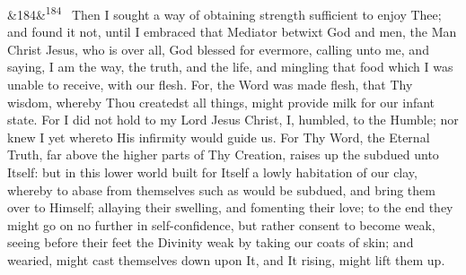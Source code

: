 \documentclass[12pt]{article}
\newcommand{\para}[1][]{\par\noindent\ifx&#1&\else\textsuperscript{\footnotesize #1}~\fi}
\begin{document}
\para[184] Then I sought a way of obtaining strength sufficient to enjoy Thee; and found it not, until I embraced that Mediator betwixt God and men, the Man Christ Jesus, who is over all, God blessed for evermore, calling unto me, and saying, I am the way, the truth, and the life, and mingling that food which I was unable to receive, with our flesh. For, the Word was made flesh, that Thy wisdom, whereby Thou createdst all things, might provide milk for our infant state. For I did not hold to my Lord Jesus Christ, I, humbled, to the Humble; nor knew I yet whereto His infirmity would guide us. For Thy Word, the Eternal Truth, far above the higher parts of Thy Creation, raises up the subdued unto Itself: but in this lower world built for Itself a lowly habitation of our clay, whereby to abase from themselves such as would be subdued, and bring them over to Himself; allaying their swelling, and fomenting their love; to the end they might go on no further in self-confidence, but rather consent to become weak, seeing before their feet the Divinity weak by taking our coats of skin; and wearied, might cast themselves down upon It, and It rising, might lift them up.
\end{document}
